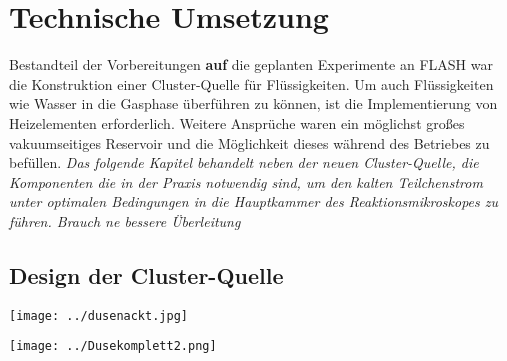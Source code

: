 \chapter{Technische Umsetzung} 

Bestandteil der Vorbereitungen \textbf{auf} die geplanten Experimente an FLASH war die Konstruktion einer Cluster-Quelle für Flüssigkeiten. Um auch Flüssigkeiten wie Wasser in die Gasphase überführen zu können, ist die Implementierung von Heizelementen erforderlich. Weitere Ansprüche waren ein möglichst großes vakuumseitiges Reservoir und die Möglichkeit dieses während des Betriebes zu befüllen. \textit{Das folgende Kapitel behandelt neben der neuen Cluster-Quelle, die Komponenten die in der Praxis notwendig sind, um den kalten Teilchenstrom unter optimalen Bedingungen in die Hauptkammer des Reaktionsmikroskopes zu führen. Brauch ne bessere Überleitung}

\section{Design der Cluster-Quelle} \label{sec:Quelle}

\begin{center}
\begin{minipage}{1\linewidth}
\centering
\texttt{[image: ../dusenackt.jpg]}%
 \label{fig:dusenackt}
\end{minipage} 
\end{center} 

\begin{center}
\begin{minipage}{\linewidth}
\centering
\texttt{[image: ../Dusekomplett2.png]}%
 \label{fig:QuerschnittDuse}
\end{minipage} 
\end{center} 

